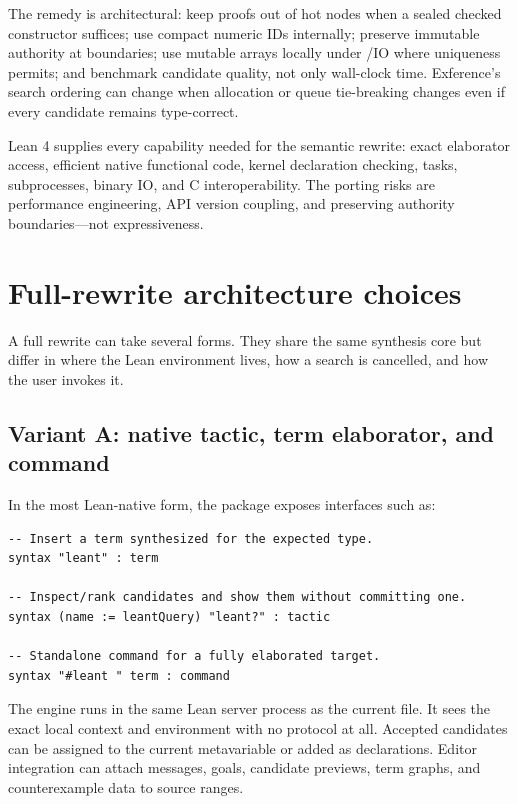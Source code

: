 \documentclass[10pt,letterpaper,oneside]{report}
\newcommand{\code}[1]{\texttt{\detokenize{#1}}}
\begin{document}
The remedy is architectural: keep proofs out of hot nodes when a sealed checked constructor suffices; use compact numeric IDs internally; preserve immutable authority at boundaries; use mutable arrays locally under \code{ST}/IO where uniqueness permits; and benchmark candidate quality, not only wall-clock time. Exference's search ordering can change when allocation or queue tie-breaking changes even if every candidate remains type-correct.

\begin{summarybox}
Lean 4 supplies every capability needed for the semantic rewrite: exact elaborator access, efficient native functional code, kernel declaration checking, tasks, subprocesses, binary IO, and C interoperability. The porting risks are performance engineering, API version coupling, and preserving authority boundaries---not expressiveness.
\end{summarybox}

\chapter{Full-rewrite architecture choices}\label{ch:full-architectures}

A full rewrite can take several forms. They share the same synthesis core but differ in where the Lean environment lives, how a search is cancelled, and how the user invokes it.

\section{Variant A: native tactic, term elaborator, and command}

In the most Lean-native form, the package exposes interfaces such as:

\begin{lstlisting}[language=Leanish]
-- Insert a term synthesized for the expected type.
syntax "leant" : term

-- Inspect/rank candidates and show them without committing one.
syntax (name := leantQuery) "leant?" : tactic

-- Standalone command for a fully elaborated target.
syntax "#leant " term : command
\end{lstlisting}

The engine runs in the same Lean server process as the current file. It sees the exact local context and environment with no protocol at all. Accepted candidates can be assigned to the current metavariable or added as declarations. Editor integration can attach messages, goals, candidate previews, term graphs, and counterexample data to source ranges.
\end{document}
